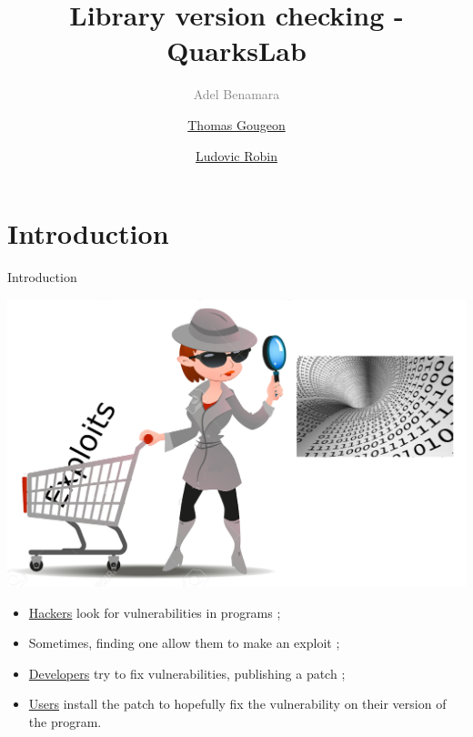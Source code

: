 \documentclass[11pt]{beamer}
\author{\textcolor{gray}{Adel Benamara} \and \underline{Thomas Gougeon} \and \underline{Ludovic
Robin}}
\title{Library version checking - QuarksLab}
\begin{document}
\begin{frame}
\titlepage
\end{frame}

\begin{frame}
\tableofcontents
\end{frame}

\section{Introduction}
\begin{frame}{Introduction}

    \begin{center}
    \includegraphics[scale=0.38]{hacker.png}
    \end{center}

    \begin{block}{}
        \begin{itemize}
            \item \underline{Hackers} look for vulnerabilities in programs ;
            \item Sometimes, finding one allow them to make an exploit ;
            \item \underline{Developers} try to fix vulnerabilities, publishing a patch ;
            \item \underline{Users} install the patch to hopefully fix the vulnerability on
                their version of the program.
        \end{itemize}
    \end{block}
\end{frame}
\end{document}
